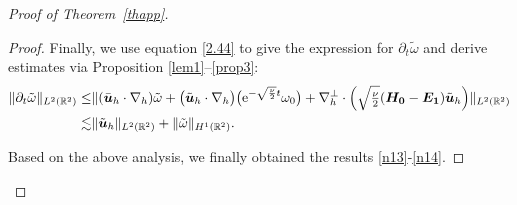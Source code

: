 \documentclass[pdflatex,sn-mathphys-num]{sn-jnl}%
\theoremstyle{thmstyleone}%
\theoremstyle{thmstyletwo}%
\theoremstyle{thmstylethree}%
\theoremstyle{thmstyletwo}
\begin{document}
\begin{proof}[Proof of Theorem~{\upshape\ref{thapp}}]
\begin{proof}
	
	Finally, we use equation \eqref{2.44} to give the expression for $\partial_t\tilde{\omega}$ and derive estimates via Proposition \ref{lem1}--\ref{prop3}:	
	\begin{align}\label{n18}
		\lVert 
		\partial_{t}\tilde{\omega}
		\rVert_{{L}^{2}(\mathbb{R}^2)}
		\leq&
		\lVert
		(\bar {\boldsymbol u}_h \cdot \nabla_h) \tilde{\omega}
		+\big(\tilde{\boldsymbol{u}}_h\cdot\nabla_{ h}\big)\big(\mathrm{e}^{-\sqrt{\frac\nu2}t}{\omega}_0\big)
		+\nabla_h^\bot\cdot
		\Big(
		\sqrt{\tfrac{\nu}{2}}
		(\boldsymbol{H_0}
		-\boldsymbol{E_1})
		\tilde{\boldsymbol{u}}_h\Big)
		\rVert_{{L}^{2}(\mathbb{R}^2)}\notag\\
		\lesssim&
		\lVert\tilde{\boldsymbol{u}}_h\rVert_{L^2(\mathbb{R}^2)}
		+\lVert\tilde{\omega}\rVert_{H^1(\mathbb{R}^2)}.
	\end{align}


	
	
	
Based on the above analysis, we finally obtained the results \eqref{n13}-\eqref{n14}.
	\end{proof}



\end{proof}
\end{document}
